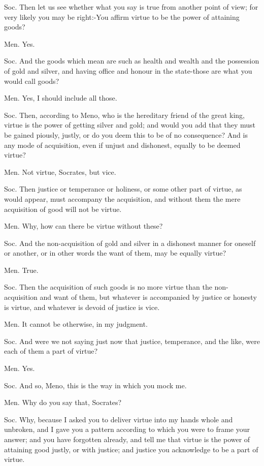 Soc. Then let us see whether what you say is true from another point
of view; for very likely you may be right:-You affirm virtue to be
the power of attaining goods? 

Men. Yes. 

Soc. And the goods which mean are such as health and wealth and the
possession of gold and silver, and having office and honour in the
state-those are what you would call goods? 

Men. Yes, I should include all those. 

Soc. Then, according to Meno, who is the hereditary friend of the
great king, virtue is the power of getting silver and gold; and would
you add that they must be gained piously, justly, or do you deem this
to be of no consequence? And is any mode of acquisition, even if unjust
and dishonest, equally to be deemed virtue? 

Men. Not virtue, Socrates, but vice. 

Soc. Then justice or temperance or holiness, or some other part of
virtue, as would appear, must accompany the acquisition, and without
them the mere acquisition of good will not be virtue. 

Men. Why, how can there be virtue without these? 

Soc. And the non-acquisition of gold and silver in a dishonest manner
for oneself or another, or in other words the want of them, may be
equally virtue? 

Men. True. 

Soc. Then the acquisition of such goods is no more virtue than the
non-acquisition and want of them, but whatever is accompanied by justice
or honesty is virtue, and whatever is devoid of justice is vice.

Men. It cannot be otherwise, in my judgment. 

Soc. And were we not saying just now that justice, temperance, and
the like, were each of them a part of virtue? 

Men. Yes. 

Soc. And so, Meno, this is the way in which you mock me.

Men. Why do you say that, Socrates? 

Soc. Why, because I asked you to deliver virtue into my hands whole
and unbroken, and I gave you a pattern according to which you were
to frame your answer; and you have forgotten already, and tell me
that virtue is the power of attaining good justly, or with justice;
and justice you acknowledge to be a part of virtue. 

